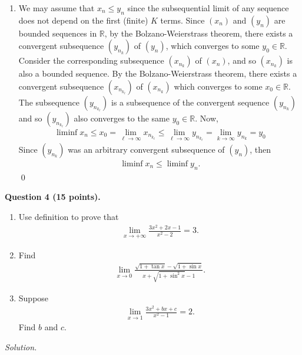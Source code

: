 \documentclass[11pt]{amsart}
\theoremstyle{plain}
\numberwithin{equation}{section}
\begin{document}
\begin{enumerate}[label=\textbf{(\roman*)}]
\item We may assume that $x_{n}\leq y_{n}$ since the subsequential limit of any sequence does not depend on the first (finite) $K$ terms. Since $\left(x_{n}\right)$ and $\left(y_{n}\right)$ are bounded sequences in $\mathbb{R}$, by the Bolzano-Weierstrass theorem, there exists a convergent subsequence $\left(y_{n_{k}}\right)$ of $\left(y_{n}\right)$, which converges to some $y_{0}\in\mathbb{R}$. Consider the corresponding subsequence $\left(x_{n_{k}}\right)$ of $\left(x_{n}\right)$, and so $\left(x_{n_{k}}\right)$ is also a bounded sequence. By the Bolzano-Weierstrass theorem, there exists a convergent subsequence $\left(x_{n_{k_{\ell}}}\right)$ of $\left(x_{n_{k}}\right)$ which converges to some $x_{0}\in\mathbb{R}$. The subsequence $\left(y_{n_{k_{\ell}}}\right)$ is a subsequence of the convergent sequence $\left(y_{n_{k}}\right)$ and so $\left(y_{n_{k_{\ell}}}\right)$ also converges to the same $y_{0}\in\mathbb{R}$. Now,
\begin{align*}
\liminf x_{n}\leq x_{0}=\lim_{\ell\to\infty}x_{n_{k_{\ell}}}\leq\lim_{\ell\to\infty}y_{n_{k_{\ell}}}=\lim_{k\to\infty}y_{n_{k}}=y_{0}
\end{align*}
Since $\left(y_{n_{k}}\right)$ was an arbitrary convergent subsequence of $\left(y_{n}\right)$, then 
\begin{align*}
    \liminf x_{n}\leq\liminf y_{n}.
\end{align*} \qed 
\end{enumerate}
\noindent\textbf{Question 4 (15 points).} 
\begin{enumerate}[label=\textbf{(\roman*)}]
    \itemsep 0em
    \item Use definition to prove that 
\begin{align*}
    \lim_{x\to+\infty}\frac{3x^{2}+2x-1}{x^{2}-2}=3.
\end{align*}
\item Find
\begin{align*}
    \lim_{x\to0}\frac{\sqrt{1+\tan x}-\sqrt{1+\sin x}}{x+\sqrt{1+\sin^{2}x}-1}.
\end{align*}
\item Suppose
\begin{align*}
    \lim_{x\to 1}\frac{3x^{2}+bx+c}{x^{2}-1}=2.
\end{align*}
Find $b$ and $c$.
\end{enumerate}
\noindent\emph{Solution.}
\end{document}
